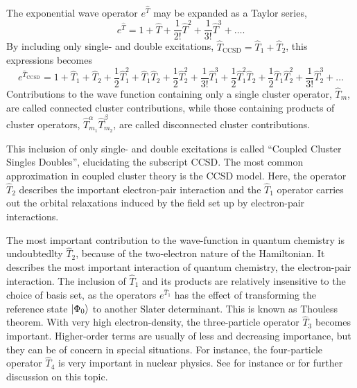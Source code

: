 The exponential wave operator $e^{\hat{T}}$ may be expanded as a Taylor series,
\begin{equation}
    e^{\hat{T}} = 1 + \hat{T} + \frac{1}{2!}\hat{T}^2
        + \frac{1}{3!}\hat{T}^3 + \dots.
\end{equation}
By including only single- and double excitations, 
$\hat{T}_{\text{CCSD}} = \hat{T}_1 + \hat{T}_2$,
this expressions becomes
\begin{equation}
    e^{\hat{T}_{\text{CCSD}}} = 
        1 + \hat{T}_1 + \hat{T}_2 
        + \frac{1}{2}\hat{T}_1^2 + \hat{T}_1\hat{T}_2 + \frac{1}{2} \hat{T}_2^2
        + \frac{1}{3!}\hat{T}_1^3 + \frac{1}{2}\hat{T}_1^2 \hat{T}_2
            + \frac{1}{2}\hat{T}_1\hat{T}_2^2 + \frac{1}{3!}\hat{T}_2^3 
        + \dots
\end{equation}
Contributions to the wave function containing only a single cluster operator, $\hat{T}_m$,
are called connected cluster contributions, while those containing products of cluster 
operators, $\hat{T}_{m_1}^{\alpha}\hat{T}_{m_2}^{\beta}$, are called disconnected
cluster contributions.

This inclusion of only single- and double excitations is called ``Coupled Cluster Singles 
Doubles'', elucidating the subscript CCSD\cite{purvis1982full}.
The most common approximation in coupled cluster theory is the CCSD model. Here, 
the operator $\hat{T}_2$ describes the important electron-pair interaction and the 
$\hat{T}_1$ operator carries out the orbital relaxations induced by the field set 
up by electron-pair interactions. 

\begin{tcolorbox}[title={Importance of different parts of the cluster operator}, 
    colback={white},
    colbacktitle={pink},
    coltitle={black}]
    The most important contribution to the wave-function in quantum chemistry is
    undoubtedlty $\hat{T}_2$, because 
    of the two-electron nature of the Hamiltonian. It describes the most important 
    interaction of quantum chemistry, the electron-pair interaction. The inclusion 
    of $\hat{T}_1$ and its products are relatively insensitive to the choice of 
    basis set, as the operators $e^{\hat{T}_1}$ has the effect of transforming 
    the reference state $\ket{\Phi_0}$ to another Slater determinant. This is known 
    as Thouless theorem\cite{thouless1960stability}. With very high electron-density,
    the three-particle operator $\hat{T}_3$ becomes important. Higher-order terms 
    are usually of less and decreasing importance, but they can be of concern in 
    special situations. For instance, the four-particle operator $\hat{T}_4$ is 
    very important in nuclear physics. See for instance 
    \citeauthor{helgaker2014molecular}\cite{helgaker2014molecular} or 
    \citeauthor{shavitt2009many}\cite{shavitt2009many} for further discussion on this
    topic.
\end{tcolorbox}


